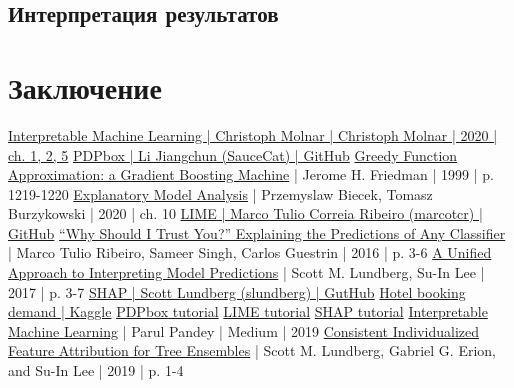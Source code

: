 \documentclass[a4paper, 12pt]{article}
\begin{document}
	\subsection{Интерпретация результатов}
	
	\newpage
	
	\section{Заключение}
	
	\newpage
	
	\begin{thebibliography}{99}
		\href{https://christophm.github.io/interpretable-ml-book/}{Interpretable Machine Learning | Christoph Molnar | Christoph Molnar | 2020 | ch. 1, 2, 5}
		\href{https://github.com/SauceCat/PDPbox}{PDPbox | Li Jiangchun (SauceCat) | GitHub}
		\href{https://www.cse.cuhk.edu.hk/irwin.king/_media/presentations/2001_greedy_function_approximation_a_gradient_boosting_machine.pdf}{Greedy Function Approximation: a Gradient Boosting Machine} | Jerome H. Friedman | 1999 | p. 1219-1220
		\href{https://pbiecek.github.io/ema/LIME.html}{Explanatory Model Analysis} | Przemyslaw Biecek, Tomasz Burzykowski | 2020 | ch. 10
		\href{https://github.com/marcotcr/lime}{LIME | Marco Tulio Correia Ribeiro (marcotcr) | GitHub}
		\href{https://arxiv.org/pdf/1602.04938.pdf}{“Why Should I Trust You?” Explaining the Predictions of Any Classifier} | Marco Tulio Ribeiro, Sameer Singh, Carlos Guestrin | 2016 | p. 3-6
		\href{https://arxiv.org/pdf/1705.07874.pdf}{A Unified Approach to Interpreting Model Predictions} | Scott M. Lundberg, Su-In Lee | 2017 | p. 3-7
		\href{https://github.com/slundberg/shap}{SHAP | Scott Lundberg (slundberg) | GutHub}
		\href{https://www.kaggle.com/jessemostipak/hotel-booking-demand}{Hotel booking demand | Kaggle}
		\href{https://pdpbox.readthedocs.io/en/latest/}{PDPbox tutorial}
		\href{https://lime-ml.readthedocs.io/en/latest/}{LIME tutorial}
		\href{https://shap.readthedocs.io/en/latest/}{SHAP tutorial}
		\href{https://towardsdatascience.com/interpretable-machine-learning-1dec0f2f3e6b}{Interpretable Machine Learning} | Parul Pandey | Medium | 2019
		\href{https://arxiv.org/pdf/1802.03888.pdf}{Consistent Individualized Feature Attribution for Tree Ensembles} | Scott M. Lundberg, Gabriel G. Erion, and Su-In Lee | 2019 | p. 1-4
	\end{thebibliography}
	\newpage
\end{document}

